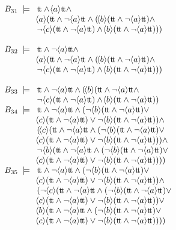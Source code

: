 \begin{example}
\[\begin{array}{l@{\;\;}c@{\;\;\;}l}
B_{31} &\models & \dtt \wedge \can{a}\dtt \wedge\\
&&\can{a}(\dtt\wedge\neg\can{a}\dtt\wedge(\can{b}(\dtt\wedge\neg\can{a}\dtt)\wedge\\
&&\neg\can{c}(\dtt\wedge\neg\can{a}\dtt)\wedge\can{b}(\dtt\wedge\neg\can{a}\dtt)))\\
\\
B_{32} &\models & \dtt \wedge \neg\can{a}\dtt \wedge\\
&&\can{a}(\dtt\wedge\neg\can{a}\dtt\wedge(\can{b}(\dtt\wedge\neg\can{a}\dtt)\wedge\\
&&\neg\can{c}(\dtt\wedge\neg\can{a}\dtt)\wedge\can{b}(\dtt\wedge\neg\can{a}\dtt)))\\
\\
B_{33} &\models & \dtt \wedge \neg\can{a}\dtt \wedge(\can{b}(\dtt\wedge\neg\can{a}\dtt\wedge\\
&&\neg\can{c}(\dtt\wedge\neg\can{a}\dtt)\wedge\can{b}(\dtt\wedge\neg\can{a}\dtt))\\
B_{34} &\models & \dtt \wedge \neg\can{a}\dtt \wedge(\neg\can{b}(\dtt\wedge\neg\can{a}\dtt)\vee\\
&&\can{c}(\dtt\wedge\neg\can{a}\dtt)\vee\neg\can{b}(\dtt\wedge\neg\can{a}\dtt))\wedge\\
&&(\can{c}(\dtt\wedge\neg\can{a}\dtt\wedge(\neg\can{b}(\dtt\wedge\neg\can{a}\dtt)\vee\\
&&\can{c}(\dtt\wedge\neg\can{a}\dtt)\vee\neg\can{b}(\dtt\wedge\neg\can{a}\dtt)))\wedge\\
&&\neg\can{b}(\dtt\wedge\neg\can{a}\dtt\wedge(\neg\can{b}(\dtt\wedge\neg\can{a}\dtt)\vee\\
&&\can{c}(\dtt\wedge\neg\can{a}\dtt)\vee\neg\can{b}(\dtt\wedge\neg\can{a}\dtt))))\\
B_{35} &\models & \dtt \wedge \neg\can{a}\dtt \wedge(\neg\can{b}(\dtt\wedge\neg\can{a}\dtt)\vee\\
&&\can{c}(\dtt\wedge\neg\can{a}\dtt)\vee\neg\can{b}(\dtt\wedge\neg\can{a}\dtt))\wedge\\
&&(\neg\can{c}(\dtt\wedge\neg\can{a}\dtt\wedge(\neg\can{b}(\dtt\wedge\neg\can{a}\dtt)\vee\\
&&\can{c}(\dtt\wedge\neg\can{a}\dtt)\vee\neg\can{b}(\dtt\wedge\neg\can{a}\dtt))\vee\\
&&\can{b}(\dtt\wedge\neg\can{a}\dtt\wedge(\neg\can{b}(\dtt\wedge\neg\can{a}\dtt)\vee\\
&&\can{c}(\dtt\wedge\neg\can{a}\dtt)\vee\neg\can{b}(\dtt\wedge\neg\can{a}\dtt))))\\
\\


\end{array}\]
\end{example}
